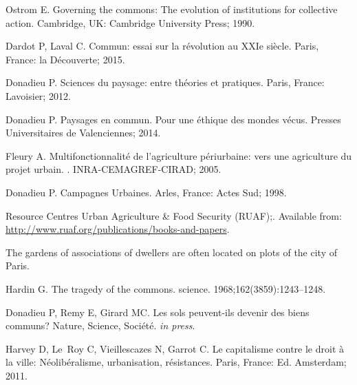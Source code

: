 \documentclass[10pt,a4paper]{article}
\renewcommand*{\refname}{References and Notes}
\begin{document}
\vspace{\baselineskip}

\begin{multicols}{2}
\renewcommand*{\refname}{References and Notes}


%

\begin{thebibliography}{10}

Ostrom E.
\newblock Governing the commons: The evolution of institutions for collective
  action.
\newblock Cambridge, UK: Cambridge University Press; 1990.

Dardot P, Laval C.
\newblock Commun: essai sur la r{\'e}volution au XXIe si{\`e}cle.
\newblock Paris, France: la D{\'e}couverte; 2015.

Donadieu P.
\newblock Sciences du paysage: entre th{\'e}ories et pratiques.
\newblock Paris, France: Lavoisier; 2012.

Donadieu P.
\newblock Paysages en commun. Pour une {\'e}thique des mondes v{\'e}cus.
\newblock Presses Universitaires de Valenciennes; 2014.

Fleury A.
\newblock Multifonctionnalit{\'e} de l'agriculture p{\'e}riurbaine: vers une
  agriculture du projet urbain.
. INRA-CEMAGREF-CIRAD; 2005.

Donadieu P.
\newblock Campagnes Urbaines.
\newblock Arles, France: Actes Sud; 1998.


Resource Centres Urban Agriculture \& Food Security (RUAF);.
\newblock Available from:
  \url{http://www.ruaf.org/publications/books-and-papers}.

  The gardens of associations of dwellers are often located on plots of the
  city of Paris.

Hardin G.
\newblock The tragedy of the commons.
\newblock science. 1968;162(3859):1243--1248.

Donadieu P, Remy E, Girard MC.
\newblock Les sols peuvent-ils devenir des biens communs?
\newblock Nature, Science, Société. \textit{in press}.

Harvey D, Le~Roy C, Vieillescazes N, Garrot C.
\newblock Le capitalisme contre le droit {\`a} la ville:
  N{\'e}olib{\'e}ralisme, urbanisation, r{\'e}sistances.
\newblock Paris, France: Ed. Amsterdam; 2011.

\end{thebibliography}





\end{multicols}
\end{document}
